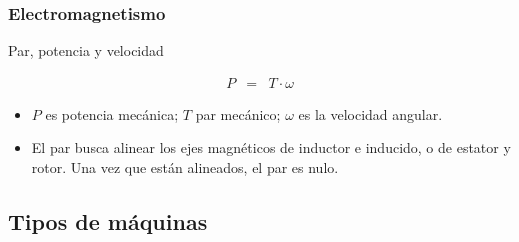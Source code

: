 \documentclass[serif, xcolor=dvipsnames]{beamer}
\begin{document}
\begin{frame}
  \frametitle{Electromagnetismo}
  \begin{block} {Par, potencia y velocidad}

\begin{eqnarray*}
  P & = & T\cdot\omega
\end{eqnarray*}

\begin{itemize}
\item $P$ es potencia mecánica; $T$ par mecánico; $\omega$ es la
  velocidad angular.
\item El par busca alinear los ejes magnéticos de inductor e inducido,
  o de estator y rotor. Una vez que están alineados, el par es nulo.
\end{itemize}
\end{block}

\end{frame}
\subsection{Tipos de máquinas}
\end{document}
